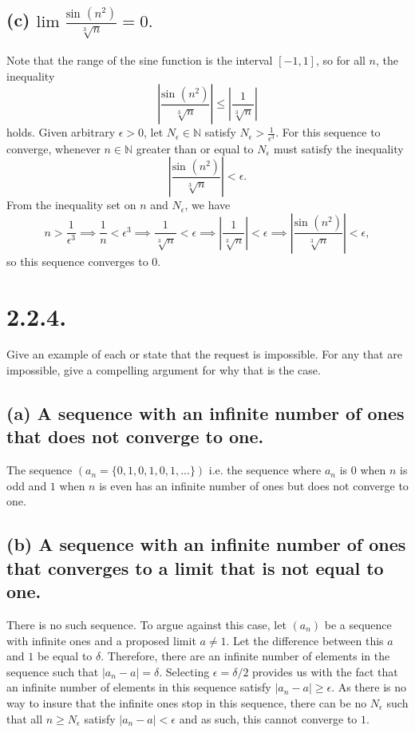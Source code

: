 \documentclass[12pt,letterpaper]{article}
\begin{document}
\subsection*{(c) \(\text{lim } \frac{\text{sin }(n^{2})}{\sqrt[3]{n}} = 0.\)}

Note that the range of the sine function is the interval \([-1,1]\), so for all \(n\), the inequality \[\left|\frac{\text{sin }(n^{2})}{\sqrt[3]{n}}\right| \leq \left|\frac{1}{\sqrt[3]{n}}\right|\] holds. Given arbitrary \(\epsilon > 0\), let \(N_{\epsilon} \in \mathbb{N}\) satisfy \(N_{\epsilon} > \frac{1}{\epsilon^{3}}\). For this sequence to converge, whenever \(n \in \mathbb{N}\) greater than or equal to  \(N_{\epsilon}\) must satisfy the inequality \[\left|\frac{\text{sin }(n^{2})}{\sqrt[3]{n}}\right| < \epsilon.\] From the inequality set on \(n\) and \(N_{\epsilon}\), we have \[n > \frac{1}{\epsilon^{3}} \implies \frac{1}{n} < \epsilon^{3} \implies \frac{1}{\sqrt[3]{n}} < \epsilon \implies \left|\frac{1}{\sqrt[3]{n}}\right| < \epsilon \implies \left|\frac{\text{sin }(n^{2})}{\sqrt[3]{n}}\right| < \epsilon,\] so this sequence converges to \(0\).

\section*{2.2.4.}
Give an example of each or state that the request is impossible. For any that are impossible, give a compelling argument for why that is the case.

\subsection*{(a) A sequence with an infinite number of ones that does not converge to one.}

The sequence \((a_{n} = \{0,1,0,1,0,1,...\})\) i.e. the sequence where \(a_{n}\) is \(0\) when \(n\) is odd and \(1\) when \(n\) is even has an infinite number of ones but does not converge to one.

\subsection*{(b) A sequence with an infinite number of ones that converges to a limit that is not equal to one.}

There is no such sequence. To argue against this case, let \((a_{n})\) be a sequence with infinite ones and a proposed limit \(a \neq 1\). Let the difference between this \(a\) and \(1\) be equal to \(\delta\). Therefore, there are an infinite number of elements in the sequence such that \(\left|a_{n} - a\right| = \delta\). Selecting \(\epsilon = \delta/2\) provides us with the fact that an infinite number of elements in this sequence satisfy \(\left|a_{n} - a\right| \geq \epsilon\). As there is no way to insure that the infinite ones stop in this sequence, there can be no \(N_{\epsilon}\) such that all \(n \geq N_{\epsilon}\) satisfy \(\left|a_{n} - a\right| < \epsilon\) and as such, this cannot converge to \(1\).
\end{document}
